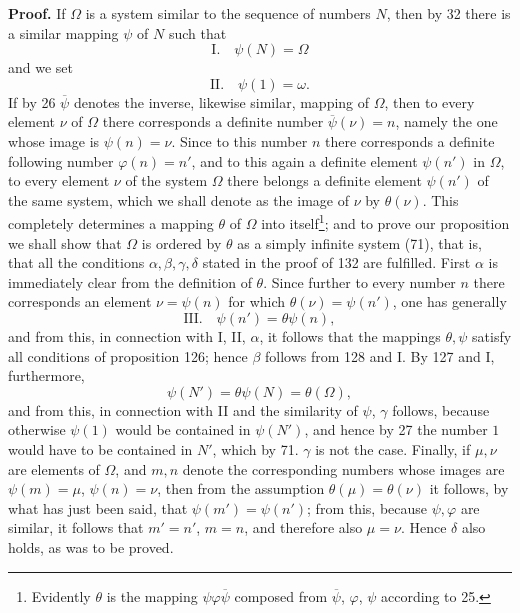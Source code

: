 \documentclass[11pt]{article}
\begin{document}
\noindent\textbf{Proof.} If $\Omega$ is a system similar to the sequence of numbers $N$, then by 32 there is a similar mapping $\psi$ of $N$ such that
\[
\text{I.}\quad \psi(N)=\Omega
\]
and we set
\[
\text{II.}\quad \psi(1)=\omega.
\]
If by 26 $\overline{\psi}$ denotes the inverse, likewise similar, mapping of $\Omega$, then to every element $\nu$ of $\Omega$ there corresponds a definite number $\overline{\psi}(\nu)=n$, namely the one whose image is $\psi(n)=\nu$. Since to this number $n$ there corresponds a definite following number $\varphi(n)=n'$, and to this again a definite element $\psi(n')$ in $\Omega$, to every element $\nu$ of the system $\Omega$ there belongs a definite element $\psi(n')$ of the same system, which we shall denote as the image of $\nu$ by $\theta(\nu)$. This completely determines a mapping $\theta$ of $\Omega$ into itself\footnote{Evidently $\theta$ is the mapping $\psi\varphi\overline{\psi}$ composed from $\overline{\psi}$, $\varphi$, $\psi$ according to 25.}; and to prove our proposition we shall show that $\Omega$ is ordered by $\theta$ as a simply infinite system (71), that is, that all the conditions $\alpha,\beta,\gamma,\delta$ stated in the proof of 132 are fulfilled. First $\alpha$ is immediately clear from the definition of $\theta$. Since further to every number $n$ there corresponds an element $\nu=\psi(n)$ for which $\theta(\nu)=\psi(n')$, one has generally
\[
\text{III.}\quad \psi(n')=\theta\psi(n),
\]
and from this, in connection with I, II, $\alpha$, it follows that the mappings $\theta,\psi$ satisfy all conditions of proposition 126; hence $\beta$ follows from 128 and I. By 127 and I, furthermore,
\[
\psi(N')=\theta\psi(N)=\theta(\Omega),
\]
and from this, in connection with II and the similarity of $\psi$, $\gamma$ follows, because otherwise $\psi(1)$ would be contained in $\psi(N')$, and hence by 27 the number $1$ would have to be contained in $N'$, which by 71. $\gamma$ is not the case. Finally, if $\mu,\nu$ are elements of $\Omega$, and $m,n$ denote the corresponding numbers whose images are $\psi(m)=\mu$, $\psi(n)=\nu$, then from the assumption $\theta(\mu)=\theta(\nu)$ it follows, by what has just been said, that $\psi(m')=\psi(n')$; from this, because $\psi,\varphi$ are similar, it follows that $m'=n'$, $m=n$, and therefore also $\mu=\nu$. Hence $\delta$ also holds, as was to be proved.
\end{document}

